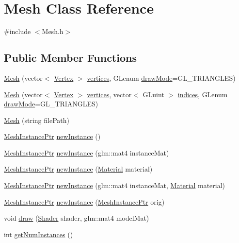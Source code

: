 \hypertarget{class_mesh}{}\section{Mesh Class Reference}
\label{class_mesh}


{\ttfamily \#include $<$Mesh.\+h$>$}

\subsection*{Public Member Functions}
\begin{DoxyCompactItemize}
\item 
\hyperlink{class_mesh_afa90b3528266a8937f40943df3af7fa7}{Mesh} (vector$<$ \hyperlink{struct_vertex}{Vertex} $>$ \hyperlink{class_mesh_abe5c05c224e47ba1e8b6393759798a9b}{vertices}, G\+Lenum \hyperlink{class_mesh_a258588a1f2686e27238f87841ec1da8f}{draw\+Mode}=G\+L\+\_\+\+T\+R\+I\+A\+N\+G\+L\+ES)
\item 
\hyperlink{class_mesh_a1b1b4d82dcb889b40d04aa3e15fec312}{Mesh} (vector$<$ \hyperlink{struct_vertex}{Vertex} $>$ \hyperlink{class_mesh_abe5c05c224e47ba1e8b6393759798a9b}{vertices}, vector$<$ G\+Luint $>$ \hyperlink{class_mesh_a233e40975b5ddafda502c8c31b77db2c}{indices}, G\+Lenum \hyperlink{class_mesh_a258588a1f2686e27238f87841ec1da8f}{draw\+Mode}=G\+L\+\_\+\+T\+R\+I\+A\+N\+G\+L\+ES)
\item 
\hyperlink{class_mesh_a1ca4486a1735d3cc171ee20c1d5178ce}{Mesh} (string file\+Path)
\item 
\hyperlink{class_mesh_instance_ptr}{Mesh\+Instance\+Ptr} \hyperlink{class_mesh_a36f1eafa576a15ffd27fb8c9cd780dff}{new\+Instance} ()
\item 
\hyperlink{class_mesh_instance_ptr}{Mesh\+Instance\+Ptr} \hyperlink{class_mesh_aa9e75b5b191927611dfc2581dda8114c}{new\+Instance} (glm\+::mat4 instance\+Mat)
\item 
\hyperlink{class_mesh_instance_ptr}{Mesh\+Instance\+Ptr} \hyperlink{class_mesh_a38063f2a7ed69bc48965b13ed851ae78}{new\+Instance} (\hyperlink{struct_material}{Material} material)
\item 
\hyperlink{class_mesh_instance_ptr}{Mesh\+Instance\+Ptr} \hyperlink{class_mesh_a1b0545939e30667c969561c97971dbdf}{new\+Instance} (glm\+::mat4 instance\+Mat, \hyperlink{struct_material}{Material} material)
\item 
\hyperlink{class_mesh_instance_ptr}{Mesh\+Instance\+Ptr} \hyperlink{class_mesh_ac61315be3238a91889d126daa230749b}{new\+Instance} (\hyperlink{class_mesh_instance_ptr}{Mesh\+Instance\+Ptr} orig)
\item 
void \hyperlink{class_mesh_a310a62733c1d6512e49067daa747eb6b}{draw} (\hyperlink{class_shader}{Shader} shader, glm\+::mat4 model\+Mat)
\item 
int \hyperlink{class_mesh_a612e62d5f06a66d4bc0e2331e169966d}{get\+Num\+Instances} ()
\end{DoxyCompactItemize}
